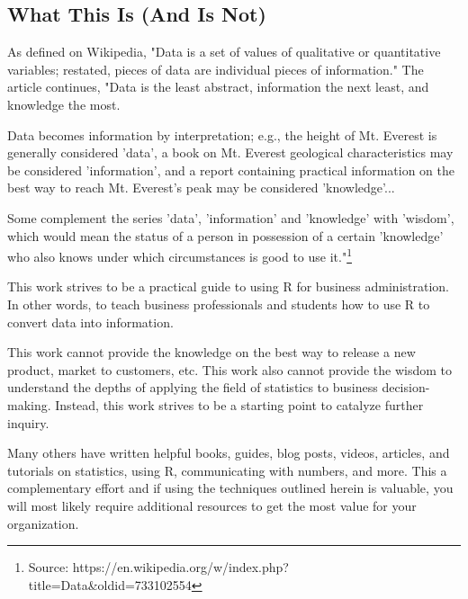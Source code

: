 %
%
%
%
% 

\subsection{What This Is (And Is Not)}
As defined on Wikipedia, "Data is a set of values of qualitative or quantitative variables; restated, pieces of data are individual pieces of information." The article continues, "Data is the least abstract, information the next least, and knowledge the most.

Data becomes information by interpretation; e.g., the height of Mt. Everest is generally considered 'data', a book on Mt. Everest geological characteristics may be considered 'information', and a report containing practical information on the best way to reach Mt. Everest's peak may be considered 'knowledge'...

Some complement the series 'data', 'information' and 'knowledge' with 'wisdom', which would mean the status of a person in possession of a certain 'knowledge' who also knows under which circumstances is good to use it."\footnote{Source: https://en.wikipedia.org/w/index.php?title=Data&oldid=733102554}

This work strives to be a practical guide to using R for business 
administration. In other words, to teach business professionals and students how to use R to convert data into information.

This work cannot provide the knowledge on the best way to release a new product, market to customers, etc. This work also cannot provide the wisdom to understand the depths of applying the field of statistics to business decision-making. Instead, this work strives to be a starting point to catalyze further inquiry.

Many others have written helpful books, guides, blog posts, videos, articles, and tutorials on statistics, using R, communicating with numbers, and more. This a complementary effort and if using the techniques outlined herein is valuable, you will most likely require additional resources to get the most value for your organization.

